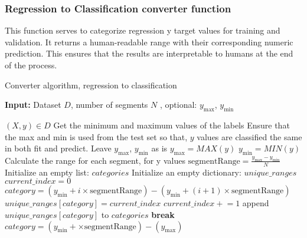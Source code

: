 \documentclass[a4paper, 12pt]{report}
\begin{document}
\subsubsection{Regression to Classification converter function}
This function serves to categorize regression y target values for training and validation. It returns a human-readable range with their corresponding numeric prediction.
This ensures that the results are interpretable to humans at the end of the process.
\begin{algorithm}[H]
    \caption{Converter algorithm, regression to classification}
    \label{alg:LingerImplicitRegressor_regression_values_to_classification_values}
    \textbf{Input:} Dataset $D$, number of segments $N$ , optional:  $y_{\text{max}}$, $y_{\text{min}}$
    \begin{algorithmic}
        \State $(X, y) \in D$
        \State Get the minimum and maximum values of the labels
        \State Ensure that the max and min is used from the test set so that, $y$ values are classified the same in both fit and predict.
            \State Leave $y_{\text{max}}$, $y_{\text{min}}$ as is
        \Else
            \State $y_{\text{max}} = MAX(y)$
            \State $y_{\text{min}} = MIN(y)$
        \EndIf
        \State Calculate the range for each segment, for y values
        \State $\text{segmentRange} = \frac{y_{\text{max}} - y_{\text{min}}}{N}$
        \State Initialize an empty list: $categories$
        \State Initialize an empty dictionary: $unique\_ranges$
        \State $current\_index = 0$
                        \State $category = (y_{\text{min}} + i \times \text{segmentRange}) - (y_{\text{min}} + (i + 1) \times \text{segmentRange})$
                            \State $unique\_ranges[category] = current\_index$
                            \State $current\_index \mathrel{+}= 1$
                        \EndIf
                        \State append $unique\_ranges[category]$ to $categories$
                        \State \textbf{break}
                    \EndIf
                \Else
                        \State $category = (y_{\text{min}} + \times \text{segmentRange}) - (y_{\text{max}})$

\end{algorithmic}
\end{algorithm}
\end{document}
